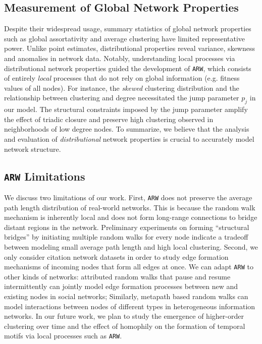 \subsection{Measurement of Global Network Properties}
Despite their widespread usage, summary statistics of global
network properties such as global assortativity and average clustering have limited representative
power. Unlike point estimates, distributional properties reveal variance, skewness and anomalies
in network data.
Notably, understanding local processes via distributional network properties
guided the development of \texttt{ARW}, which consists of entirely \textit{local} processes
that do not rely on global information (e.g. fitness values of all nodes).
For instance, the \textit{skewed} clustering distribution and the relationship between clustering and
degree necessitated the jump parameter $p_j$ in our model. The structural constraints imposed by the jump
parameter amplify the effect of triadic closure and preserve high clustering
observed in neighborhoods of low degree nodes.
To summarize, we believe that the analysis and evaluation of \textit{distributional}
network properties is crucial to accurately model network structure.


\subsection{\texttt{ARW} Limitations}
We discuss two limitations of our work. First, \texttt{ARW} does not preserve the average
path length distribution of real-world networks. This is because the random walk
mechanism is inherently local and does not form long-range connections to bridge
distant regions in the network. Preliminary experiments on forming ``structural bridges''
by initiating multiple random walks for every node indicate a tradeoff
between modeling small average path length and high local clustering. Second,
we only consider citation network datasets in order to study edge formation mechanisms of
incoming nodes that form all edges at once. We can adapt \texttt{ARW} to other
kinds of networks: attributed random walks that pause and resume intermittently
can jointly model edge formation processes between new and existing nodes in
social networks; Similarly, metapath based random walks can model interactions between
nodes of different types in heterogeneous information networks.
In our future work, we plan to study the emergence of higher-order clustering
\cite{yin2018higher} over time and the effect of homophily on the formation of
temporal motifs \cite{paranjape2017motifs} via local processes such as \texttt{ARW}.

